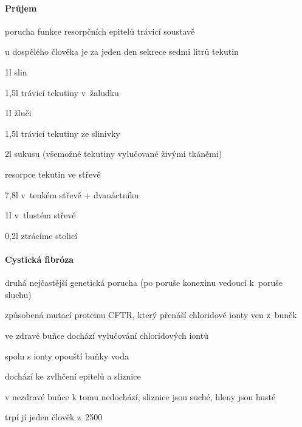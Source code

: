 \documentclass[DIV=8]{scrreprt}
\begin{document}
\paragraph{Průjem}
\begin{myItemize}[nosep]
    \item porucha funkce resorpčních epitelů trávicí soustavě
    \item u dospělého člověka je za jeden den sekrece sedmi litrů tekutin
\begin{myItemize}[nosep]
    \item 1l slin
    \item 1,5l trávicí tekutiny v žaludku
    \item 1l žluči
    \item 1,5l trávicí tekutiny ze slinivky
    \item 2l sukusu (všemožné tekutiny vylučované živými tkáněmi)
\end{myItemize}

    \item resorpce tekutin ve střevě
\begin{myItemize}[nosep]
    \item 7,8l v tenkém střevě + dvanáctníku
    \item 1l v tlustém střevě
\end{myItemize}

    \item 0,2l ztrácíme stolicí
\end{myItemize}



\paragraph{Cystická fibróza}
\begin{myItemize}[nosep]
    \item druhá nejčastější genetická porucha (po poruše konexinu vedoucí k poruše sluchu)
    \item způsobená mutací proteinu CFTR, který přenáší chloridové ionty ven z buněk
\begin{myItemize}[nosep]
    \item ve zdravé buňce dochází vylučování chloridových iontů
\begin{myItemize}[nosep]
    \item spolu s ionty opouští buňky voda
    \item dochází ke zvlhčení epitelů a sliznice
\end{myItemize}

    \item v nezdravé buňce k tomu nedochází, sliznice jsou suché, hleny jsou husté
\end{myItemize}

    \item trpí jí jeden člověk z 2500
\end{myItemize}
\end{document}

